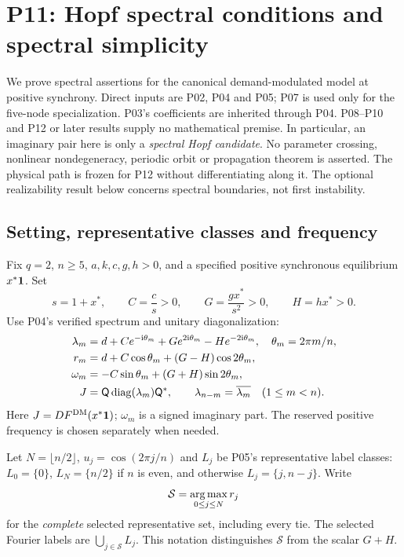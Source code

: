 \section{P11: Hopf spectral conditions and spectral simplicity}
\label{sec:P11}
We prove spectral assertions for the canonical demand-modulated model at
positive synchrony. Direct inputs are P02, P04 and P05; P07 is used only
for the five-node specialization. P03's coefficients are inherited through
P04. P08--P10 and P12 or later results supply no mathematical premise.
In particular, an imaginary pair here is only a \emph{spectral Hopf
candidate}. No parameter crossing, nonlinear nondegeneracy, periodic
orbit or propagation theorem is asserted. The physical path is frozen for
P12 without differentiating along it. The optional realizability result
below concerns spectral boundaries, not first instability.

\subsection{Setting, representative classes and frequency}
\label{slot:P11-1}
Fix $q=2$, $n\ge5$, $a,k,c,g,h>0$, and a specified positive synchronous
equilibrium $x^*\mathbf{1}$. Set
\begin{equation}
 s=1+x^*,\qquad C=\frac cs>0,\qquad
 G=\frac{gx^*}{s^2}>0,\qquad H=hx^*>0.
 \label{eq:P11-effective}
\end{equation}
Use P04's verified spectrum and unitary diagonalization:
\begin{align}
 \lambda_m&=d+Ce^{-\mathrm{i}\theta_m}+Ge^{2\mathrm{i}\theta_m}
                       -He^{-2\mathrm{i}\theta_m},\quad \theta_m=2\pi m/n,
                       \label{eq:P11-input}\\
 r_m&=d+C\cos\theta_m+(G-H)\cos2\theta_m,\nonumber\\
 \omega_m&=-C\sin\theta_m+(G+H)\sin2\theta_m,\nonumber\\
 J&=\mathsf{Q}\operatorname{diag}(\lambda_m)\mathsf{Q}^*,\qquad
 \lambda_{n-m}=\overline{\lambda_m}\quad(1\le m<n).\nonumber
\end{align}
Here $J=DF^{\mathrm{DM}}(x^*\mathbf{1})$; $\omega_m$ is a signed imaginary part.
The reserved positive frequency is chosen separately when needed.

Let $N=\lfloor n/2\rfloor$, $u_j=\cos(2\pi j/n)$ and
$L_j$ be P05's representative label classes: $L_0=\{0\}$,
$L_N=\{n/2\}$ if $n$ is even, and otherwise
$L_j=\{j,n-j\}$. Write
\[
 \mathcal S=\operatorname*{arg\,max}_{0\le j\le N}r_j
\]
for the \emph{complete} selected representative set, including every tie.
The selected Fourier labels are $\bigcup_{j\in\mathcal S}L_j$.
This notation distinguishes $\mathcal S$ from the scalar $G+H$.

